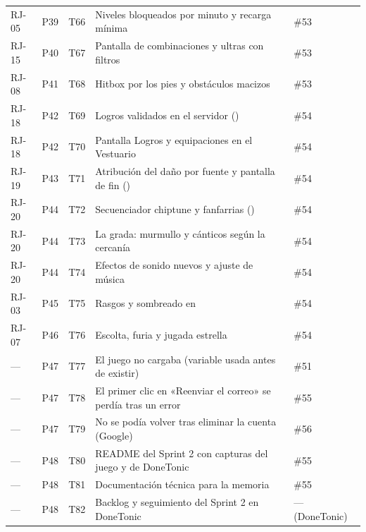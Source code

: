 {\begin{longtable}{@{}L{1.4cm} L{0.7cm} L{1.2cm} L{6.8cm} L{3.2cm}@{}}
RJ-05 & P39 & T66 & Niveles bloqueados por minuto y recarga mínima & \#53 \\
RJ-15 & P40 & T67 & Pantalla de combinaciones y ultras con filtros & \#53 \\
RJ-08 & P41 & T68 & Hitbox por los pies y obstáculos macizos & \#53 \\
RJ-18 & P42 & T69 & Logros validados en el servidor () & \#54 \\
RJ-18 & P42 & T70 & Pantalla Logros y equipaciones en el Vestuario & \#54 \\
RJ-19 & P43 & T71 & Atribución del daño por fuente y pantalla de fin () & \#54 \\
RJ-20 & P44 & T72 & Secuenciador chiptune y fanfarrias () & \#54 \\
RJ-20 & P44 & T73 & La grada: murmullo y cánticos según la cercanía & \#54 \\
RJ-20 & P44 & T74 & Efectos de sonido nuevos y ajuste de música & \#54 \\
RJ-03 & P45 & T75 & Rasgos y sombreado en  & \#54 \\
RJ-07 & P46 & T76 & Escolta, furia y jugada estrella & \#54 \\
— & P47 & T77 & El juego no cargaba (variable usada antes de existir) & \#51 \\
— & P47 & T78 & El primer clic en «Reenviar\allowbreak{} el correo» se perdía tras un error & \#55 \\
— & P47 & T79 & No se podía volver tras eliminar la cuenta (Google) & \#56 \\
— & P48 & T80 & README del Sprint 2 con capturas del juego y de DoneTonic & \#55 \\
— & P48 & T81 & Documentación técnica para la memoria & \#55 \\
— & P48 & T82 & Backlog y seguimiento del Sprint 2 en DoneTonic & — (DoneTonic) \\*
\bottomrule
\end{longtable}
}
